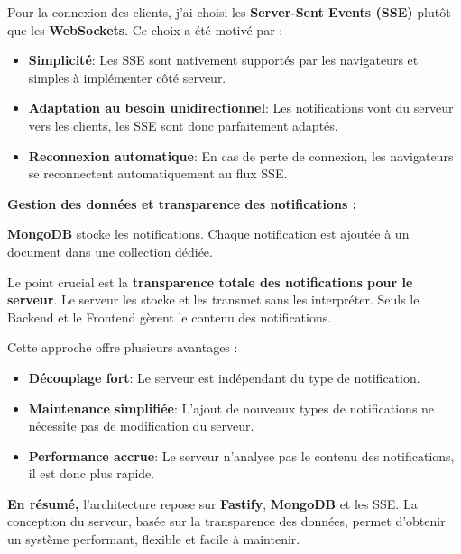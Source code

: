 Pour la connexion des clients, j'ai choisi les {\bf Server-Sent Events (SSE)}
plutôt que les {\bf WebSockets}. Ce choix a été motivé par :

\begin{itemize}
    \item {\bf Simplicité}: Les SSE sont nativement supportés par les navigateurs et simples
à implémenter côté serveur.
    \item {\bf Adaptation au besoin unidirectionnel}: Les notifications vont du serveur vers
les clients, les SSE sont donc parfaitement adaptés.
    \item {\bf Reconnexion automatique}: En cas de perte de connexion, les navigateurs se
reconnectent automatiquement au flux SSE.
\end{itemize}

{\bf Gestion des données et transparence des notifications :}

{\bf MongoDB} stocke les notifications. Chaque notification est ajoutée à un
document dans une collection dédiée.

Le point crucial est la {\bf transparence totale des notifications pour le
serveur}. Le serveur les stocke et les transmet sans les interpréter. Seuls le
Backend et le Frontend gèrent le contenu des notifications.

Cette approche offre plusieurs avantages :

\begin{itemize}
    \item {\bf Découplage fort}: Le serveur est indépendant du type de notification.
    \item {\bf Maintenance simplifiée}: L'ajout de nouveaux types de notifications ne
nécessite pas de modification du serveur.
    \item {\bf Performance accrue}: Le serveur n'analyse pas le contenu des notifications,
il est donc plus rapide.
\end{itemize}

{\bf En résumé,} l'architecture repose sur {\bf Fastify}, {\bf MongoDB} et les SSE. La
conception du serveur, basée sur la transparence des données, permet d'obtenir
un système performant, flexible et facile à maintenir.
